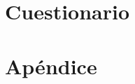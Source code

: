 \documentclass[report,12pt]{article}
\begin{document}
	\section{Cuestionario}

	
	
	
	
	
	\section{Apéndice}
\end{document}
